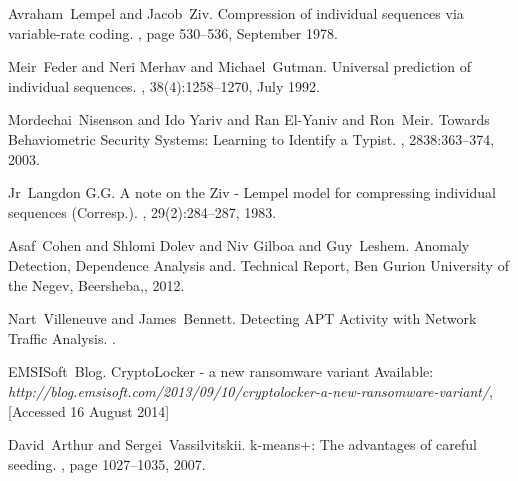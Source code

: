 \documentclass[9pt,journal,compsoc]{IEEEtran}
\begin{document}
%
%
%
\begin{thebibliography}{10}

Avraham~Lempel and Jacob~Ziv.
\newblock Compression of individual sequences via variable-rate coding.
, page 530–536, September 1978.

Meir~Feder and Neri Merhav and Michael~Gutman.
\newblock Universal prediction of individual sequences.
, 38(4):1258–1270, July 1992.

Mordechai~Nisenson and Ido Yariv and Ran El-Yaniv and Ron~Meir.
\newblock Towards Behaviometric Security Systems: Learning to Identify a Typist.
, 2838:363–374, 2003.

Jr~Langdon G.G.
\newblock A note on the Ziv - Lempel model for compressing individual sequences (Corresp.).
, 29(2):284–287, 1983.

Asaf~Cohen and Shlomi Dolev and Niv Gilboa and Guy~Leshem.
\newblock Anomaly Detection, Dependence Analysis and.
\newblock Technical Report, Ben Gurion University of the Negev, Beersheba,, 2012.

Nart~Villeneuve and James~Bennett.
\newblock Detecting APT Activity with Network Traffic Analysis.
.

EMSISoft~Blog.
\newblock CryptoLocker - a new ransomware variant
\newblock Available: {\em http://blog.emsisoft.com/2013/09/10/cryptolocker-a-new-ransomware-variant/}, [Accessed 16 August 2014]

David~Arthur and Sergei~Vassilvitskii.
\newblock k-means+: The advantages of careful seeding.
, page 1027–1035, 2007.


\end{thebibliography}
\end{document}
